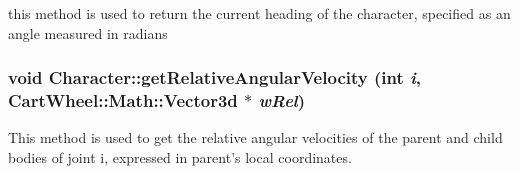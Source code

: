 \label{classCartWheel_1_1Core_1_1Character_ac9c987a3deecb7d310d2baae5830fae6}
this method is used to return the current heading of the character, specified as an angle measured in radians \hypertarget{classCartWheel_1_1Core_1_1Character_abafe6f70e8f4a202b37b9a6c488c7a2b}{
\subsubsection[{getRelativeAngularVelocity}]{\setlength{\rightskip}{0pt plus 5cm}void Character::getRelativeAngularVelocity (int {\em i}, \/  {\bf CartWheel::Math::Vector3d} $\ast$ {\em wRel})}}
\label{classCartWheel_1_1Core_1_1Character_abafe6f70e8f4a202b37b9a6c488c7a2b}
This method is used to get the relative angular velocities of the parent and child bodies of joint i, expressed in parent's local coordinates.

